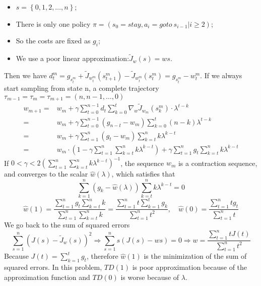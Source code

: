 \begin{example}
    \begin{itemize}
        \item $ s = \left\{ 0, 1, 2, \ldots, n \right\} $;
        \item There is only one policy $ \pi = (s_0 = stay, a_i = goto\ s_{i-1} | i \ge 2) $;
        \item So the costs are fixed as $ g_i $;
        \item We use a poor linear approximation:$ \tilde J_{w}(s) = ws $.
    \end{itemize}

    Then we have $ d^m_t = g_{s^m_t} + \tilde J_{w^m_t}(s^m_{t+1}) - \tilde J_{w^m_t} (s^m_t) = g_{s^m_t} - w^m_t  $.
    If we always start sampling from state n, a complete trajectory $ \tau_{m-1} = \tau_m = \tau_{m+1} = (n, n-1, \ldots, 0) $
    \begin{align*}
        w_{m+1} =& w_{m} + \gamma \sum^{n-1}_{t=0} d_t \sum^{t}_{k=0} \nabla_{w} \tilde J_{w_m}(s^m_k) \cdot \lambda^{t-k}\\
        =& w_{m} + \gamma \sum^{n-1}_{t=0} (g_{n-t} - w_m) \sum^{t}_{k=0} (n-k) \lambda^{t-k}\\
        =& w_m + \gamma \sum^{n}_{t=1} (g_{t} - w_m) \sum^{n}_{k = t} k \lambda^{k-t}\\
        =& w_m \cdot \left( 1 - \gamma \sum^{n}_{t = 1} \sum^{n}_{k=t} k \lambda^{k-t} \right) + \gamma \sum^{n}_{t=1} g_t \sum^{n}_{k=t} k \lambda^{k-t}
    \end{align*}
    If $ 0 < \gamma < 2{\left( \sum^{n}_{t = 1} \sum^{n}_{k=t} k \lambda^{k-t}  \right)}^{-1} $, the sequence $ w_m $ is a contraction sequence, and converges to the scalar $ \hat w(\lambda) $, which satisfies that
    \[
        \sum^{n}_{k=1} (g_k - \hat w(\lambda)) \sum^{n}_{k=t} k\lambda^{k-t} = 0
    \]
    \[
        \hat w(1) = \frac{ \sum^{n}_{t=1} g_t \sum^{n}_{k=t} k}{ \sum^{n}_{t=1} \sum^{n}_{k=t} k}
        = \frac{ \sum^{n}_{t = 1} t \sum^{t}_{k=1} g_k}{ \sum^{n}_{t=1} t^2} , \quad
        \hat w(0) = \frac{ \sum^{n}_{t=1} t g_t  }{ \sum^{n}_{t=1} t } 
    \]
    We go back to the sum of squared errors
    \[
        \sum^{n}_{s=1} {\left( J(s) - \tilde J_{w}(s) \right)}^{2} \Rightarrow \sum^{n}_{s=1} s(J(s) - w s) = 0 \Rightarrow w = \frac{ \sum^{n}_{t=1} t J(t) }{ \sum^{n}_{t=1} t^2} 
    \]
    Because $ J(t) = \sum^{t}_{k = 1} g_t $, therefore $ \hat w(1) $ is the minimization of the sum of squared errors.
    In this problem, $ TD(1) $ is poor approximation because of the approximation function and $ TD(0) $ is worse because of $ \lambda $.
\end{example}

